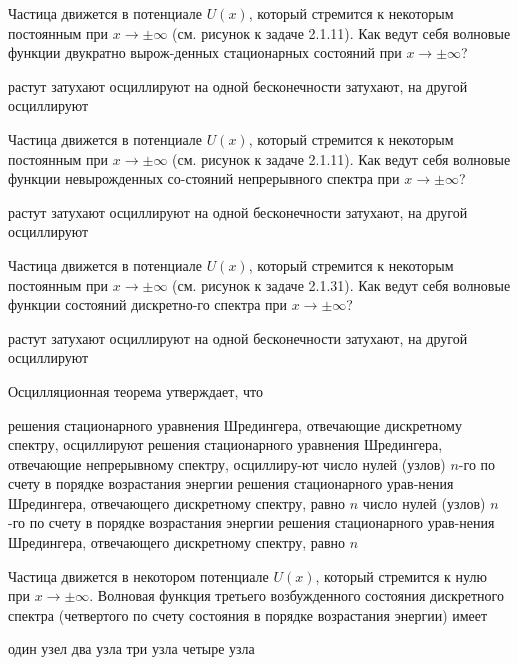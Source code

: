\documentclass[11pt,a4paper]{exam}
\begin{document}
\begin{questions}
\question Частица движется в потенциале $U(x)$, который стремится к некоторым постоянным при $x \to  \pm \infty $ (см. рисунок к задаче 2.1.11). Как ведут себя волновые функции двукратно вырож-денных стационарных состояний при $x \to  \pm \infty $?
\begin{choices}
\choice растут         
\choice затухают       
\choice осциллируют
\choice на одной бесконечности затухают, на другой осциллируют
\end{choices}

\question Частица движется в потенциале $U(x)$, который стремится к некоторым постоянным при $x \to  \pm \infty $ (см. рисунок к задаче 2.1.11). Как ведут себя волновые функции невырожденных со-стояний непрерывного спектра при $x \to  \pm \infty $?
\begin{choices}
\choice растут         
\choice затухают       
\choice осциллируют
\choice на одной бесконечности затухают, на другой осциллируют
\end{choices}

\question Частица движется в потенциале $U(x)$, который стремится к некоторым постоянным при $x \to  \pm \infty $ (см. рисунок к задаче 2.1.31). Как ведут себя волновые функции состояний дискретно-го спектра при $x \to  \pm \infty $?
\begin{choices}
\choice растут         
\choice затухают       
\choice осциллируют
\choice на одной бесконечности затухают, на другой осциллируют
\end{choices}

\question Осцилляционная теорема утверждает, что
\begin{choices}
\choice решения стационарного уравнения Шредингера, отвечающие дискретному спектру, осциллируют
\choice решения стационарного уравнения Шредингера, отвечающие непрерывному спектру, осциллиру-ют
\choice число нулей (узлов) $n$-го по счету в порядке возрастания энергии решения стационарного урав-нения Шредингера, отвечающего дискретному спектру, равно $n$
\choice число нулей (узлов) $n$-го по счету в порядке возрастания энергии решения стационарного урав-нения Шредингера, отвечающего дискретному спектру, равно $n$
\end{choices}

\question Частица движется в некотором потенциале $U(x)$, который стремится к нулю при $x \to  \pm \infty $. Волновая функция третьего возбужденного состояния дискретного спектра (четвертого по счету состояния в порядке возрастания энергии) имеет
\begin{choices}
\choice один узел         
\choice два узла    
\choice три узла       
\choice четыре узла
\end{choices}


\end{questions}
\end{document}
